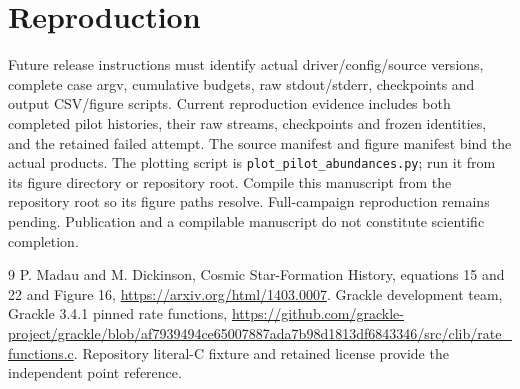 \documentclass[11pt]{article}
\begin{document}
\section{Reproduction}
Future release instructions must identify actual driver/config/source versions, complete case argv, cumulative budgets, raw stdout/stderr, checkpoints and output CSV/figure scripts. Current reproduction evidence includes both completed pilot histories, their raw streams, checkpoints and frozen identities, and the retained failed attempt. The source manifest and figure manifest bind the actual products. The plotting script is \texttt{plot\_pilot\_abundances.py}; run it from its figure directory or repository root. Compile this manuscript from the repository root so its figure paths resolve. Full-campaign reproduction remains pending. Publication and a compilable manuscript do not constitute scientific completion.
\begin{thebibliography}{9}
 P. Madau and M. Dickinson, Cosmic Star-Formation History, equations 15 and 22 and Figure 16, \url{https://arxiv.org/html/1403.0007}.
 Grackle development team, Grackle 3.4.1 pinned rate functions, \url{https://github.com/grackle-project/grackle/blob/af7939494ce65007887ada7b98d1813df6843346/src/clib/rate_functions.c}. Repository literal-C fixture and retained license provide the independent point reference.
\end{thebibliography}
\end{document}
